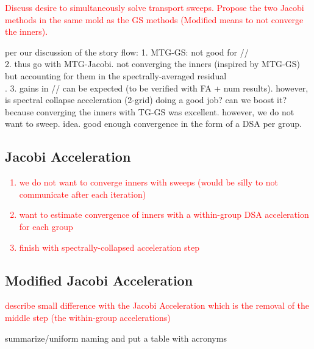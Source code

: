 \documentclass[preprint,10pt]{elsarticle}
\newcommand{\tcr}[1]{\textcolor{red}{#1}}
\begin{document}
\tcr{Discuss desire to simultaneously solve transport sweeps. Propose the two Jacobi methods in the same mold as the GS methods (Modified means to not converge the inners).}

per our discussion of the story flow:
1. MTG-GS: not good for // \\
2. thus go with MTG-Jacobi. not converging the inners (inspired by MTG-GS) but accounting for them in the spectrally-averaged residual \\. 
3. gains in // can be expected (to be verified with FA + num results). however, is spectral collapse acceleration (2-grid) doing a good job? can we boost it? because converging the inners with TG-GS was excellent. however, we do not want to sweep. idea. good enough convergence in the form of a DSA per group.


\subsection{Jacobi Acceleration}
\tcr
{
\begin{enumerate}
\item we do not want to converge inners with sweeps (would be silly to not communicate after each iteration)
\item want to estimate convergence of inners with a within-group DSA acceleration for each group
\item finish with spectrally-collapsed acceleration step
\end{enumerate}
}

\subsection{Modified Jacobi Acceleration}

\tcr{
describe small difference with the Jacobi Acceleration which is the removal of the middle step (the within-group accelerations)
}

summarize/uniform naming and put a table with acronyms 

\end{document}
